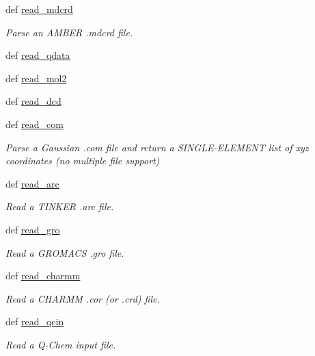 \begin{DoxyCompactItemize}
def \hyperlink{classforcebalance_1_1molecule_1_1Molecule_ab1b56d66b7673b2631e2cee013a80b93}{read\-\_\-mdcrd}
\begin{DoxyCompactList}\small\item\em \-Parse an \-A\-M\-B\-E\-R .mdcrd file. \end{DoxyCompactList}\item 
def \hyperlink{classforcebalance_1_1molecule_1_1Molecule_a1d34af6a7d22dd34850d58efe8595b20}{read\-\_\-qdata}
\item 
def \hyperlink{classforcebalance_1_1molecule_1_1Molecule_a14b1fbc70a083d21fd016b5dd854fd56}{read\-\_\-mol2}
\item 
def \hyperlink{classforcebalance_1_1molecule_1_1Molecule_ad8fa6cc7424aae00ee3f5bb87d28e037}{read\-\_\-dcd}
\item 
def \hyperlink{classforcebalance_1_1molecule_1_1Molecule_a861feda06e1f60ab25c45eaaaf228cfc}{read\-\_\-com}
\begin{DoxyCompactList}\small\item\em \-Parse a \-Gaussian .com file and return a \-S\-I\-N\-G\-L\-E-\/\-E\-L\-E\-M\-E\-N\-T list of xyz coordinates (no multiple file support) \end{DoxyCompactList}\item 
def \hyperlink{classforcebalance_1_1molecule_1_1Molecule_aeb5983ae61079198f077f55e448e2c32}{read\-\_\-arc}
\begin{DoxyCompactList}\small\item\em \-Read a \-T\-I\-N\-K\-E\-R .arc file. \end{DoxyCompactList}\item 
def \hyperlink{classforcebalance_1_1molecule_1_1Molecule_a963a4382dc59ebd8dd9ee2064843e355}{read\-\_\-gro}
\begin{DoxyCompactList}\small\item\em \-Read a \-G\-R\-O\-M\-A\-C\-S .gro file. \end{DoxyCompactList}\item 
def \hyperlink{classforcebalance_1_1molecule_1_1Molecule_a8b8d3444945cab760288f28996787855}{read\-\_\-charmm}
\begin{DoxyCompactList}\small\item\em \-Read a \-C\-H\-A\-R\-M\-M .cor (or .crd) file. \end{DoxyCompactList}\item 
def \hyperlink{classforcebalance_1_1molecule_1_1Molecule_a003b182b54de4473c4691ae1474b1ada}{read\-\_\-qcin}
\begin{DoxyCompactList}\small\item\em \-Read a \-Q-\/\-Chem input file. \end{DoxyCompactList}\item 

\end{DoxyCompactItemize}
